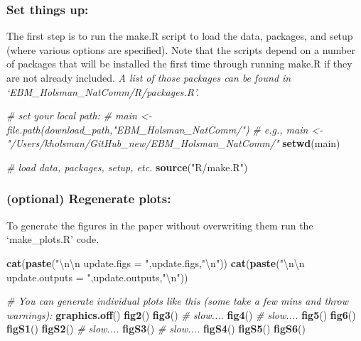 \documentclass[]{article}
\newenvironment{Shaded}{\begin{snugshade}}{\end{snugshade}}
\newcommand{\KeywordTok}[1]{\textcolor[rgb]{0.13,0.29,0.53}{\textbf{{#1}}}}
\newcommand{\CharTok}[1]{\textcolor[rgb]{0.31,0.60,0.02}{{#1}}}
\newcommand{\StringTok}[1]{\textcolor[rgb]{0.31,0.60,0.02}{{#1}}}
\newcommand{\CommentTok}[1]{\textcolor[rgb]{0.56,0.35,0.01}{\textit{{#1}}}}
\newcommand{\NormalTok}[1]{{#1}}
\begin{document}
\subsubsection{Set things up:}\label{set-things-up}

The first step is to run the make.R script to load the data, packages,
and setup (where various options are specified). Note that the scripts
depend on a number of packages that will be installed the first time
through running make.R if they are not already included. \emph{A list of
those packages can be found in `EBM\_Holsman\_NatComm/R/packages.R'.}

\begin{Shaded}
\begin{Highlighting}[]
    \CommentTok{# set your local path:}
    \CommentTok{# main        <-  file.path(download_path,"EBM_Holsman_NatComm/")}
    \CommentTok{# e.g., main  <-  "/Users/kholsman/GitHub_new/EBM_Holsman_NatComm/"}
    \KeywordTok{setwd}\NormalTok{(main)}
    
    \CommentTok{# load data, packages, setup, etc.}
    \KeywordTok{source}\NormalTok{(}\StringTok{"R/make.R"}\NormalTok{)}
\end{Highlighting}
\end{Shaded}

\subsubsection{(optional) Regenerate
plots:}\label{optional-regenerate-plots}

To generate the figures in the paper without overwriting them run the
`make\_plots.R' code.

\begin{Shaded}
\begin{Highlighting}[]
    \KeywordTok{cat}\NormalTok{(}\KeywordTok{paste}\NormalTok{(}\StringTok{"}\CharTok{\textbackslash{}n\textbackslash{}n}\StringTok{ update.figs  = "}\NormalTok{,update.figs,}\StringTok{"}\CharTok{\textbackslash{}n}\StringTok{"}\NormalTok{))}
    \KeywordTok{cat}\NormalTok{(}\KeywordTok{paste}\NormalTok{(}\StringTok{"}\CharTok{\textbackslash{}n\textbackslash{}n}\StringTok{ update.outputs  = "}\NormalTok{,update.outputs,}\StringTok{"}\CharTok{\textbackslash{}n}\StringTok{"}\NormalTok{))}

    \CommentTok{# You can generate individual plots like this (some take a few mins and throw warnings):}
    \KeywordTok{graphics.off}\NormalTok{()}
    \KeywordTok{fig2}\NormalTok{()}
    \KeywordTok{fig3}\NormalTok{() }\CommentTok{#  slow....}
    \KeywordTok{fig4}\NormalTok{() }\CommentTok{#  slow....}
    \KeywordTok{fig5}\NormalTok{()}
    \KeywordTok{fig6}\NormalTok{()}
    \KeywordTok{figS1}\NormalTok{()}
    \KeywordTok{figS2}\NormalTok{() }\CommentTok{#  slow....}
    \KeywordTok{figS3}\NormalTok{() }\CommentTok{#  slow....}
    \KeywordTok{figS4}\NormalTok{()}
    \KeywordTok{figS5}\NormalTok{()}
    \KeywordTok{figS6}\NormalTok{()}
\end{Highlighting}
\end{Shaded}
\end{document}
